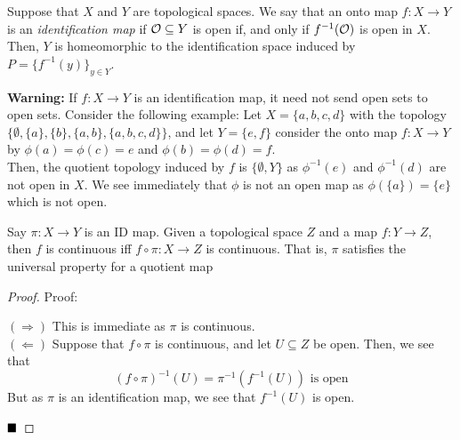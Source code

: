 \begin{definition}
    Suppose that $X$ and $Y$ are topological spaces. We say that an onto map $f : X \to Y$ is an \emph{identification map} if $\cal{O} \subseteq Y$ is open if, and only if $f^{-1}(\cal{O})$ is open in $X$. Then, $Y$ is homeomorphic to the identification space induced by $P = \{f^{-1}(y)\}_{y \in Y}$.  
\end{definition}

\textbf{Warning:} If $f : X \to Y$ is an identification map, it need not send open sets to open sets. Consider the following example: Let $X = \{a, b, c, d\}$ with the topology $\{\emptyset, \{a\}, \{b\}, \{a, b\}, \{a, b, c, d\}\}$, and let $Y = \{e, f\}$ consider the onto map $f : X \to Y$ by $\phi(a) = \phi(c) = e$ and $\phi(b) = \phi(d) = f$.\\

Then, the quotient topology induced by $f$ is $\{\emptyset, Y\}$ as $\phi^{-1}(e)$ and $\phi^{-1}(d)$ are not open in $X$. We see immediately that $\phi$ is not an open map as $\phi(\{a\}) = \{e\}$ which is not open. 

\begin{lemma}
    Say $\pi : X \to Y$ is an ID map. Given a topological space $Z$ and a map $f : Y \to Z$, then $f$ is continuous iff $f \circ \pi : X \to Z$ is continuous. That is, $\pi$ satisfies the universal property for a quotient map
    \begin{center}
    \end{center}

\end{lemma}
\begin{proof}{Proof:}

    $(\Rightarrow)$ This is immediate as $\pi$ is continuous.\\

    $(\Leftarrow)$ Suppose that $f \circ \pi$ is continuous, and let $U \subseteq Z$ be open. Then, we see that
    \[ (f \circ \pi)^{-1}(U) = \pi^{-1}(f^{-1}(U)) \text{ is open} \]
    But as $\pi$ is an identification map, we see that $f^{-1}(U)$ is open. 

    $\qed$
\end{proof}

